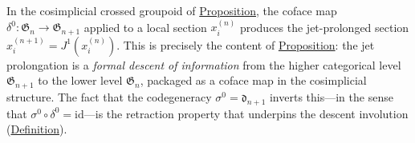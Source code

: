 \begin{remark}
  \label{rem:jet-as-descent}
In the cosimplicial crossed groupoid of
\hyperref[prop:cosimplicial-crossed-groupoid]{Proposition}, the coface map
$\delta^0 \colon \mathfrak{G}_n \to \mathfrak{G}_{n+1}$ applied to a
local section $x_i^{(n)}$ produces the jet-prolonged section
$x_i^{(n+1)} = J^1(x_i^{(n)})$.  This is precisely the content of
\hyperref[prop:jet-prolongation]{Proposition}: the jet prolongation is a
\emph{formal descent of information} from the higher categorical level
$\mathfrak{G}_{n+1}$ to the lower level $\mathfrak{G}_n$, packaged as a
coface map in the cosimplicial structure.  The fact that the codegeneracy
$\sigma^0 = \mathfrak{d}_{n+1}$ inverts this---in the sense that
$\sigma^0 \circ \delta^0 = \mathrm{id}$---is the retraction property that
underpins the descent involution (\hyperref[def:descent-involution]{Definition}).
\end{remark}

